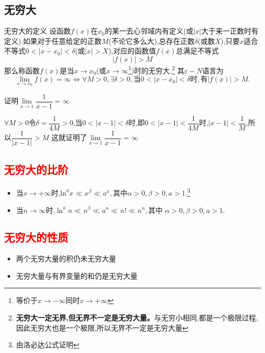 \documentclass[12pt, a4paper, oneside, UTF8]{ctexbook}
\begin{document}
\begin{sloppypar}
    \subsection{无穷大}
    \begin{defn}{无穷大的定义}{}
        设函数$f(x)$在$x_0$的某一去心邻域内有定义(或$|x|$大于来一正数时有定义).如果对于任意给定的正数$M$(不论它多么大),总存在正数$\delta$(或数$X$),只要$x$适合不等式$0<|x-x_0|<\delta$(或$|x|>X$),对应的函数值$f(x)$总满足不等式
        $$
            |f(x)|>M
        $$
        那么称函数$f(x)$是当$x\to x_0$(或$x\to\infty$\footnote{等价于$x \to -\infty$同时$x \to +\infty$})时的无穷大.\footnote{\textbf{无穷大一定无界,但无界不一定是无穷大量。}与无穷小相同,都是一个极限过程,因此无穷大也是一个极限,所以无界不一定是无穷大量}
        其$\varepsilon-N$语言为
        $$
            \lim\limits_{x\to x_0}f(x)= \infty \Leftrightarrow\forall M >0,\exists\delta>0,\text{当}0<|x-x_0|<\delta\text{时},\text{有}|f(x)|>M.
        $$
    \end{defn}
    \begin{problem}
    证明$\underset{x\rightarrow1}{\operatorname*{lim}}\dfrac{1}{x-1}=\infty $
    \end{problem}
    \begin{solution}
        $\forall M>0$令$\delta=\dfrac{1}{4M}>0$,当$0<|x-1|<\delta$时,即$0<|x-1|<\dfrac{1}{4M}$时,$|x-1|<\dfrac{1}{M}$,所以$\dfrac{1}{|x-1|}>M$
        这就证明了$\underset{x\rightarrow1}{\operatorname*{lim}}\dfrac{1}{x-1}=\infty$
    \end{solution}
    \subsection{\textcolor{red}{无穷大的比阶}}
    \begin{itemize}
        \item 当$x \to +\infty$时,$\mathrm{ln}^ax\ll x^\beta\ll a^x,\text{其中}\alpha>0,\beta>0,a>1.$\footnote{由洛必达公式证明}
        \item 当$n \to \infty$时,$\ln^an\ll n^\beta\ll a^n\ll n!\ll n^n,\text{其中 }\alpha>0,\beta>0,a>1.$
    \end{itemize}
    \subsection{\textcolor{red}{无穷大的性质}}
    \begin{itemize}
        \item 两个无穷大量的积仍未无穷大量
        \item 无穷大量与有界变量的和仍是无穷大量
    \end{itemize}

\end{sloppypar}
\end{document}
